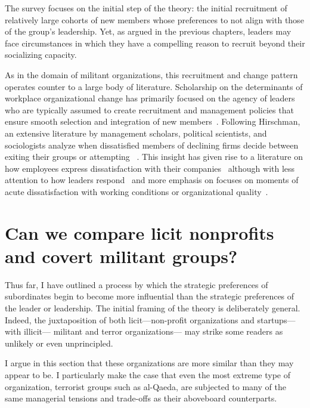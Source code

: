 The survey focuses on the initial step of the theory: the initial recruitment of relatively large cohorts of new members whose preferences to not align with those of the group's leadership. Yet, as argued in the previous chapters, leaders may face circumstances in which they have a compelling reason to recruit beyond their socializing capacity.

As in the domain of militant organizations, this recruitment and change pattern operates counter to a large body of literature. Scholarship on the determinants of workplace organizational change has primarily focused on the agency of leaders who are typically assumed to create recruitment and management policies that ensure smooth selection and integration of new members~\autocite{barber1998recruiting, kotter2012leading, rynes1989recruitment, kotter2012heart, paglis2002leadership, wanous1992organizational}.  Following Hirschman, an extensive literature by management scholars, political scientists, and sociologists analyze when dissatisfied members of declining firms decide between exiting their groups or attempting ~\autocite[30]{hirschman1970exit}. This insight has given rise to a literature on how employees express dissatisfaction with their companies~\autocite{bjorgo2008leaving, dowding2000exit, farrell1983exit, wilkinson2011new, wilkinson2014handbook, withey1989predicting} although with less attention to how leaders respond~\autocite{liu2010warn} and more emphasis on focuses on moments of acute dissatisfaction with working conditions or organizational quality~\autocite{morrison2011employee}.

\section{Can we compare licit nonprofits and covert militant groups?}

Thus far, I have outlined a process by which the strategic preferences of subordinates begin to become more influential than the strategic preferences of the leader or leadership. The initial framing of the theory is deliberately general. Indeed, the juxtaposition of both licit---non-profit organizations and startups--- with illicit--- militant and terror organizations--- may strike some readers as unlikely or even unprincipled. 

I argue in this section that these organizations are more similar than they may appear to be. I particularly make the case that even the most extreme type of organization, terrorist groups such as al-Qaeda, are subjected to many of the same managerial tensions and trade-offs as their aboveboard counterparts. 

